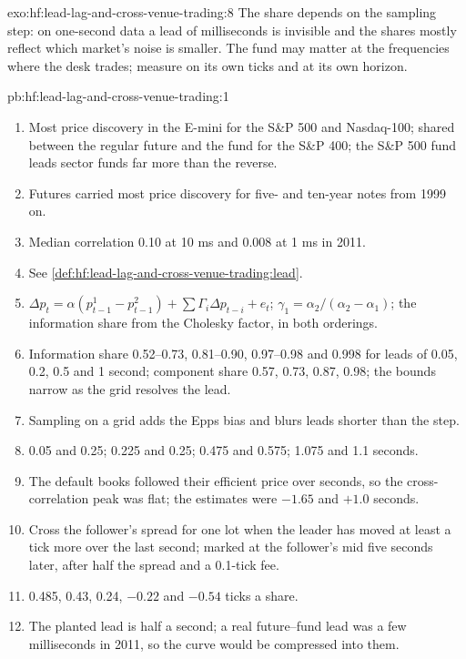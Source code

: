 \begin{solution}{exo:hf:lead-lag-and-cross-venue-trading:8}
The share depends on the sampling step: on one-second data a lead of milliseconds is invisible and the shares mostly reflect which market's noise is
smaller. The fund may matter at the frequencies where the desk trades; measure on its own ticks and at its own horizon.
\end{solution}

\begin{solution}{pb:hf:lead-lag-and-cross-venue-trading:1}
\begin{enumerate}
\item Most price discovery in the E-mini for the S\&P 500 and Nasdaq-100; shared between the regular future and the fund for the S\&P 400; the S\&P 500
fund leads sector funds far more than the reverse.
\item Futures carried most price discovery for five- and ten-year notes from 1999 on.
\item Median correlation 0.10 at 10 ms and 0.008 at 1 ms in 2011.
\item See \cref{def:hf:lead-lag-and-cross-venue-trading:lead}.
\item $\Delta p_t=\alpha(p^1_{t-1}-p^2_{t-1})+\sum\Gamma_i\Delta p_{t-i}+e_t$; $\gamma_1=\alpha_2/(\alpha_2-\alpha_1)$; the information share from the Cholesky
factor, in both orderings.
\item Information share 0.52--0.73, 0.81--0.90, 0.97--0.98 and 0.998 for leads of 0.05, 0.2, 0.5 and 1 second; component share 0.57, 0.73, 0.87,
0.98; the bounds narrow as the grid resolves the lead.
\item Sampling on a grid adds the Epps bias and blurs leads shorter than the step.
\item 0.05 and 0.25; 0.225 and 0.25; 0.475 and 0.575; 1.075 and 1.1 seconds.
\item The default books followed their efficient price over seconds, so the cross-correlation peak was flat; the estimates were $-1.65$ and $+1.0$
seconds.
\item Cross the follower's spread for one lot when the leader has moved at least a tick more over the last second; marked at the follower's mid five
seconds later, after half the spread and a 0.1-tick fee.
\item 0.485, 0.43, 0.24, $-0.22$ and $-0.54$ ticks a share.
\item The planted lead is half a second; a real future--fund lead was a few milliseconds in 2011, so the curve would be compressed into them.

\end{enumerate}
\end{solution}

